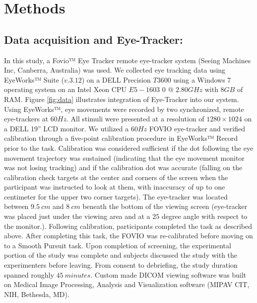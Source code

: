\documentclass[preprint,12pt]{elsarticle}
\begin{document}
\section{Methods}
\subsection{Data acquisition and Eye-Tracker:}
In this study, a Fovio™ Eye Tracker  remote eye-tracker system (Seeing Machines Inc, Canberra, Australia) was used. We collected eye tracking data using EyeWorks™ Suite ($v. 3.12$) on a DELL Precision $T3600$ using a Windows 7 operating system on an Intel Xeon CPU $E5-1603$ 0 @ $2.80 GHz$ with $8 GB$ of RAM. Figure \ref{fig:data} illustrates integration of Eye-Tracker into our system. Using EyeWorks™, eye movements were recorded by two synchronized, remote eye-trackers at $60 Hz$. All stimuli were presented at a resolution of $1280\times 1024$ on a DELL 19” LCD monitor. We utilized a $60 Hz$ FOVIO eye-tracker and verified calibration through a five-point calibration procedure in EyeWorks™ Record prior to the task. Calibration was considered sufficient if the dot following the eye movement trajectory was sustained (indicating that the eye movement monitor was not losing tracking) and if the calibration dot was accurate (falling on the calibration check targets at the center and corners of the screen when the participant was instructed to look at them, with inaccuracy of up to one centimeter for the upper two corner targets). The eye-tracker was located between $9.5\ cm$ and $8\ cm$ beneath the bottom of the viewing screen (eye-tracker was placed just under the viewing area and at a $25$ degree angle with respect to the monitor.). Following calibration, participants completed the task as described above. After completing this task, the FOVIO was re-calibrated before moving on to a Smooth Pursuit task. Upon completion of screening, the experimental portion of the study was complete and subjects discussed the study with the experimenters before leaving. From consent to debriefing, the study duration spanned roughly $45\ minutes$. Custom made DICOM viewing software was built on Medical Image Processing, Analysis and Visualization software (MIPAV CIT, NIH, Bethesda, MD).
\end{document}
